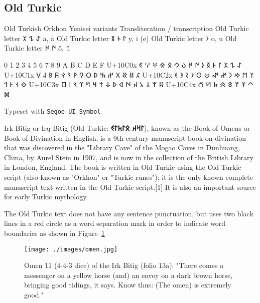 \subsection{Old Turkic}

\newfontfamily{}
\begin{scriptexample}[]{Old Turkish}
\oldturkic
\obeylines
Orkhon	Yenisei
variants	Transliteration / transcription
Old Turkic letter  𐰀	𐰁 𐰂	a, ä
Old Turkic letter  𐰃	𐰄 𐰅	y, i (e)
Old Turkic letter  𐰆		o, u
Old Turkic letter  𐰇	𐰈	ö, ü

	0	1	2	3	4	5	6	7	8	9	A	B	C	D	E	F
U+10C0x	𐰀	𐰁	𐰂	𐰃	𐰄	𐰅	𐰆	𐰇	𐰈	𐰉	𐰊	𐰋	𐰌	𐰍	𐰎	𐰏
U+10C1x	𐰐	𐰑	𐰒	𐰓	𐰔	𐰕	𐰖	𐰗	𐰘	𐰙	𐰚	𐰛	𐰜	𐰝	𐰞	𐰟
U+10C2x	𐰠	𐰡	𐰢	𐰣	𐰤	𐰥	𐰦	𐰧	𐰨	𐰩	𐰪	𐰫	𐰬	𐰭	𐰮	𐰯
U+10C3x	𐰰	𐰱	𐰲	𐰳	𐰴	𐰵	𐰶	𐰷	𐰸	𐰹	𐰺	𐰻	𐰼	𐰽	𐰾	𐰿
U+10C4x	𐱀	𐱁	𐱂	𐱃	𐱄	𐱅	𐱆	𐱇	𐱈	

\hfill  Typeset with \texttt{Segoe UI Symbol} \cmd{\oldturkic} 
\end{scriptexample}

Irk Bitig or Irq Bitig (Old Turkic: {\bfseries\Large\oldturkic 𐰃𐰺𐰴 𐰋𐰃𐱅𐰃𐰏}), known as the Book of Omens or Book of Divination in English, is a 9th-century manuscript book on divination that was discovered in the "Library Cave" of the Mogao Caves in Dunhuang, China, by Aurel Stein in 1907, and is now in the collection of the British Library in London, England. The book is written in Old Turkic using the Old Turkic script (also known as "Orkhon" or "Turkic runes"); it is the only known complete manuscript text written in the Old Turkic script.[1] It is also an important source for early Turkic mythology.

The Old Turkic text does not have any sentence punctuation, but uses two black lines in a red circle as a word separation mark in order to indicate word boundaries as shown in Figure~{\ref{omen}}

\begin{figure}[htb]
\texttt{[image: ./images/omen.jpg]}
\caption{Omen 11 (4-4-3 dice) of the Irk Bitig (folio 13a): "There comes a messenger on a yellow horse (and) an envoy on a dark brown horse, bringing good tidings, it says. Know thus: (The omen) is extremely good."}
\label{omen}
\end{figure}